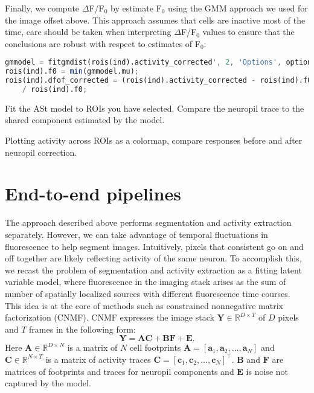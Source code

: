 \documentclass[a4paper]{report}
\newcommand{\nexercise}[0]{\arabic{exercises}\addtocounter{exercises}{1}}
\begin{document}
Finally, we compute $\Delta$F/F$_0$ by estimate F$_0$ using the GMM approach we used for the image offset above. This approach assumes that cells are inactive most of the time, care should be taken when interpreting $\Delta$F/F$_0$ values to ensure that the conclusions are robust with respect to estimates of F$_0$:
\begin{lstlisting}[language=Octave]
gmmodel = fitgmdist(rois(ind).activity_corrected', 2, 'Options', options);
rois(ind).f0 = min(gmmodel.mu);
rois(ind).dfof_corrected = (rois(ind).activity_corrected - rois(ind).f0) ...
    / rois(ind).f0;  
\end{lstlisting}

\begin{exercisebox}[frametitle={Exercise \nexercise: Neuropil correction}]
Fit the ASt model to ROIs you have selected.
Compare the neuropil trace to the shared component estimated by the model.

Plotting activity across ROIs as a colormap, compare responses before and after neuropil correction.
\end{exercisebox}

\section{End-to-end pipelines}
The approach described above performs segmentation and activity extraction separately. 
However, we can take advantage of temporal fluctuations in fluorescence to help segment images. 
Intuitively, pixels that consistent go on and off together are likely reflecting activity of the same neuron. 
To accomplish this, we recast the problem of segmentation and activity extraction as a fitting latent variable model, where fluorescence in the imaging stack arises as the sum of number of spatially localized sources with different fluorescence time courses.
This idea is at the core of methods such as constrained nonnegative matrix factorization (CNMF).
CNMF expresses the image stack $\mathbf{Y} \in \mathbb { R } ^ { D \times T }$ of $D$ pixels and $T$ frames in the following form:
\begin{equation}
	\mathbf{Y} = \mathbf{AC} + \mathbf{BF} + \mathbf{E}.
	\label{eq:cnmf}
\end{equation}
Here $\mathbf{A} \in \mathbb { R } ^ { D \times N }$ is a matrix of $N$ cell footprints $\mathbf{A} = [ \mathbf { a } _ { 1 } , \mathbf { a } _ { 2 } , \ldots , \mathbf { a } _ { N } ]$ and $\mathbf{C} \in \mathbb { R } ^ { N \times T }$ is a matrix of activity traces $\mathbf{C} = [ \mathbf { c } _ { 1 } , \mathbf { c } _ { 2 } , \ldots , \mathbf { c } _ { N } ] ^ { \top }$. 
$\mathbf{B}$ and $\mathbf{F}$ are matrices of footprints and traces for neuropil components and $\mathbf{E}$ is noise not captured by the model.
\end{document}
